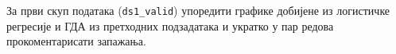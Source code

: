 \item {}
За први скуп података (\texttt{ds1\_valid}) упоредити графике добијене из логистичке регресије и ГДА из претходних подзадатака и укратко у пар редова прокоментарисати запажања.

